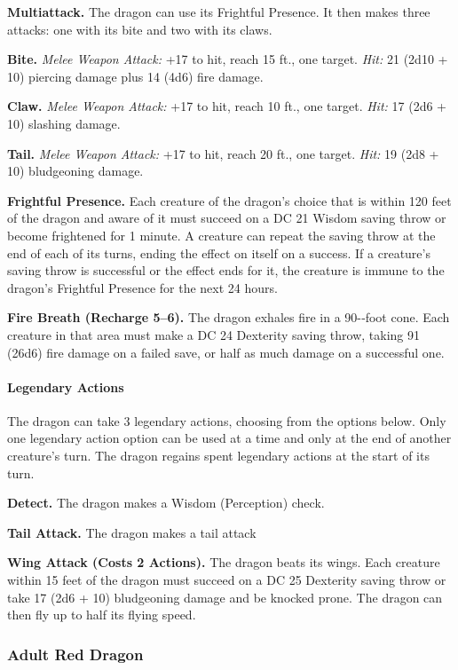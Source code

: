 \documentclass[
]{article}
\begin{document}
\textbf{Multiattack.} The dragon can use its Frightful Presence. It then
makes three attacks: one with its bite and two with its claws.

\textbf{Bite.} \emph{Melee Weapon Attack:} +17 to hit, reach 15 ft., one
target. \emph{Hit:} 21 (2d10 + 10) piercing damage plus 14 (4d6) fire
damage.

\textbf{Claw.} \emph{Melee Weapon Attack:} +17 to hit, reach 10 ft., one
target. \emph{Hit:} 17 (2d6 + 10) slashing damage.

\textbf{Tail.} \emph{Melee Weapon Attack:} +17 to hit, reach 20 ft., one
target. \emph{Hit:} 19 (2d8 + 10) bludgeoning damage.

\textbf{Frightful Presence.} Each creature of the dragon's choice that
is within 120 feet of the dragon and aware of it must succeed on a DC 21
Wisdom saving throw or become frightened for 1 minute. A creature can
repeat the saving throw at the end of each of its turns, ending the
effect on itself on a success. If a creature's saving throw is
successful or the effect ends for it, the creature is immune to the
dragon's Frightful Presence for the next 24 hours.

\textbf{Fire Breath (Recharge 5--6).} The dragon exhales fire in a
90-­‐foot cone. Each creature in that area must make a DC 24 Dexterity
saving throw, taking 91 (26d6) fire damage on a failed save, or half as
much damage on a successful one.

\hypertarget{legendary-actions-6}{%
\paragraph{Legendary Actions}\label{legendary-actions-6}}

The dragon can take 3 legendary actions, choosing from the options
below. Only one legendary action option can be used at a time and only
at the end of another creature's turn. The dragon regains spent
legendary actions at the start of its turn.

\textbf{Detect.} The dragon makes a Wisdom (Perception) check.

\textbf{Tail Attack.} The dragon makes a tail attack

\textbf{Wing Attack (Costs 2 Actions).} The dragon beats its wings. Each
creature within 15 feet of the dragon must succeed on a DC 25 Dexterity
saving throw or take 17 (2d6 + 10) bludgeoning damage and be knocked
prone. The dragon can then fly up to half its flying speed.

\hypertarget{adult-red-dragon}{%
\subsubsection{Adult Red Dragon}\label{adult-red-dragon}}
\end{document}
